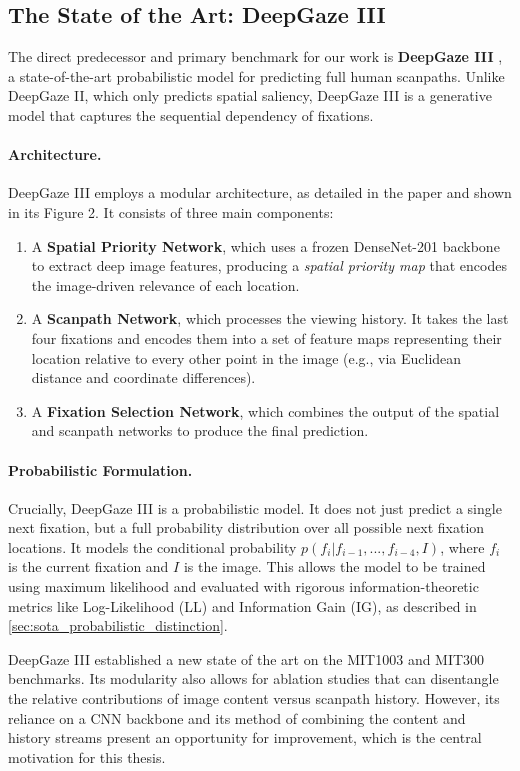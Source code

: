 \subsection{The State of the Art: DeepGaze III}
\label{sec:sota_deepgaze3}

The direct predecessor and primary benchmark for our work is \textbf{DeepGaze III} \cite{kummerer2022deepgaze}, a state-of-the-art probabilistic model for predicting full human scanpaths. Unlike DeepGaze II, which only predicts spatial saliency, DeepGaze III is a generative model that captures the sequential dependency of fixations.

\paragraph{Architecture.} DeepGaze III employs a modular architecture, as detailed in the paper and shown in its Figure 2. It consists of three main components:
\begin{enumerate}
    \item A \textbf{Spatial Priority Network}, which uses a frozen DenseNet-201 backbone to extract deep image features, producing a \emph{spatial priority map} that encodes the image-driven relevance of each location.
    \item A \textbf{Scanpath Network}, which processes the viewing history. It takes the last four fixations and encodes them into a set of feature maps representing their location relative to every other point in the image (e.g., via Euclidean distance and coordinate differences).
    \item A \textbf{Fixation Selection Network}, which combines the output of the spatial and scanpath networks to produce the final prediction.
\end{enumerate}

\paragraph{Probabilistic Formulation.} Crucially, DeepGaze III is a probabilistic model. It does not just predict a single next fixation, but a full probability distribution over all possible next fixation locations. It models the conditional probability $p(f_i | f_{i-1}, ..., f_{i-4}, I)$, where $f_i$ is the current fixation and $I$ is the image. This allows the model to be trained using maximum likelihood and evaluated with rigorous information-theoretic metrics like Log-Likelihood (LL) and Information Gain (IG), as described in \cref{sec:sota_probabilistic_distinction}.

DeepGaze III established a new state of the art on the MIT1003 and MIT300 benchmarks. Its modularity also allows for ablation studies that can disentangle the relative contributions of image content versus scanpath history. However, its reliance on a CNN backbone and its method of combining the content and history streams present an opportunity for improvement, which is the central motivation for this thesis.
